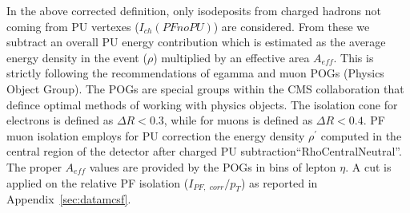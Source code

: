 In the above corrected definition, only isodeposits from charged hadrons not coming from PU vertexes ($I_{ch}(PFnoPU)$) are considered.  From these we subtract an overall PU energy contribution which is estimated as the average energy density in the event ($\rho$) multiplied by an effective area $A_{eff}$. This is strictly following the recommendations of egamma and muon POGs (Physics Object Group). The POGs are special groups within the CMS collaboration that defince optimal methods of working with physics objects. The isolation cone for electrons is defined as $\Delta R < 0.3$, while for muons is defined as $\Delta R < 0.4$. PF muon isolation employs for PU correction the energy density $\rho^\prime$ computed in the central region of the detector after charged PU subtraction``RhoCentralNeutral''. The proper $A_{eff}$ values are provided by the POGs in bins of lepton $\eta$. A cut is applied on the relative PF isolation ($I_{PF, \,\, corr} / p_T$) as reported in Appendix~\ref{sec:datamcsf}.




